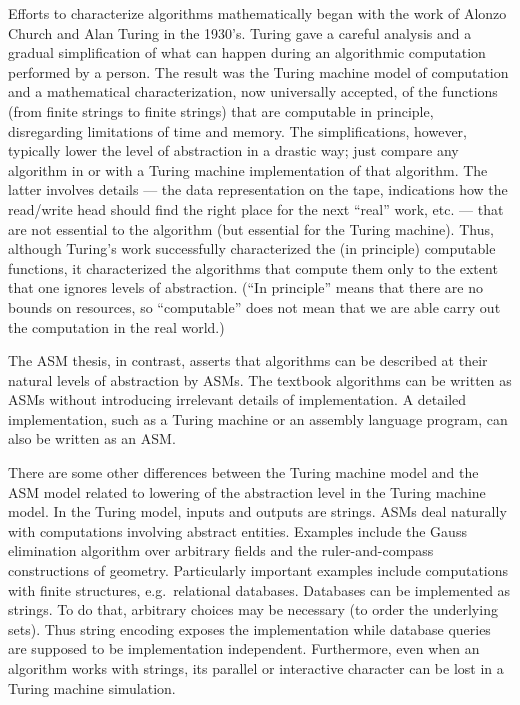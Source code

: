 \documentclass{LMCS}
\theoremstyle{definition}
\begin{document}
Efforts to characterize algorithms mathematically began with the work
of Alonzo Church \cite{church} and Alan Turing \cite{turing} in the
1930's.  Turing gave a careful analysis and a gradual simplification
of what can happen during an algorithmic computation performed by a
person.  The result was the Turing machine model of computation and a
mathematical characterization, now universally accepted, of the
functions (from finite strings to finite strings) that are computable
in principle, disregarding limitations of time and memory.  The
simplifications, however, typically lower the level of abstraction in
a drastic way; just compare any algorithm in \cite{alg-text1} or
\cite{alg-text2} with a Turing machine implementation of that
algorithm.  The latter involves details --- the data representation on
the tape, indications how the read/write head should find the right
place for the next ``real'' work, etc. --- that are not essential to
the algorithm (but essential for the Turing machine).  Thus, although
Turing's work successfully characterized the (in principle) computable
functions, it characterized the algorithms that compute them only to
the extent that one ignores levels of abstraction.  (``In principle''
means that there are no bounds on resources, so ``computable'' does
not mean that we are able carry out the computation in the real
world.)

The ASM thesis, in contrast, asserts that algorithms can be described at
their natural levels of abstraction by ASMs.  The textbook algorithms can
be written as ASMs without introducing irrelevant details of
implementation.  A detailed implementation, such as a Turing machine or an
assembly language program, can also be written as an ASM.

There are some other differences between the Turing machine model and the
ASM model related to lowering of the abstraction level in the Turing
machine model.  In the Turing model, inputs and outputs are strings.  ASMs
deal naturally with computations involving abstract entities.  Examples
include the Gauss elimination algorithm over arbitrary fields and the
ruler-and-compass constructions of geometry.  Particularly important
examples include computations with finite structures, e.g.\ relational
databases.  Databases can be implemented as strings.  To do that, arbitrary
choices may be necessary (to order the underlying sets).  Thus string
encoding exposes the implementation while database queries are supposed to
be implementation independent.  Furthermore, even when an algorithm works
with strings, its parallel or interactive character can be lost in a
Turing machine simulation.
\end{document}
